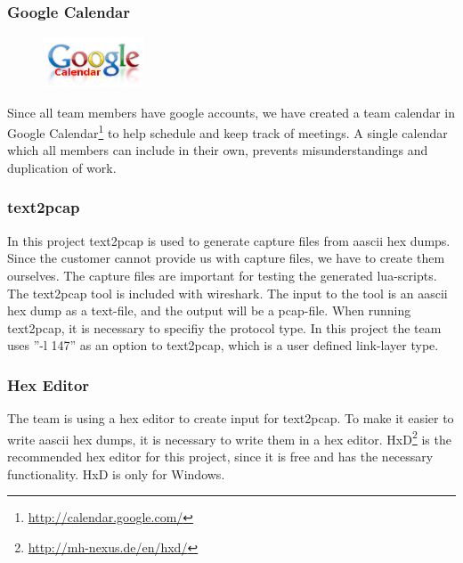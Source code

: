 \subsubsection{Google Calendar}
\begin{figure}
	\vspace{-20pt}
	\includegraphics[width=3cm]{./planning/img/google_calendar_logo}
	\vspace{-20pt}
\end{figure}
Since all team members have google accounts, we have created a team calendar
in Google Calendar\footnote{\url{http://calendar.google.com/}}
to help schedule and keep track of meetings. A single calendar which all
members can include in their own, prevents misunderstandings and duplication
of work.

\subsubsection{text2pcap}
In this project text2pcap is used to generate capture files from \gls{aascii}
\glspl{hex dump}. Since the customer cannot provide us with capture files, 
we have to create them ourselves. The capture files are important for testing
the generated \Gls{lua}-\glspl{script}. The text2pcap tool is included with \Gls{wireshark}. 
The input to the tool is an \gls{aascii} \gls{hex dump} as a text-file, and the output will
be a \gls{pcap-file}. When running text2pcap, it is necessary to specifiy the \gls{protocol}
type. In this project the team uses ''-l 147'' as an option to text2pcap,
which is a user defined \gls{link-layer} type.

\subsubsection{Hex Editor}
The team is using a hex editor to create input for text2pcap. To make it
easier to write \gls{aascii} \glspl{hex dump}, it is necessary to write them in a hex editor.
HxD\footnote{\url{http://mh-nexus.de/en/hxd/}} is the recommended hex editor
for this project, since it is free and has the necessary functionality. HxD is
only for Windows.

